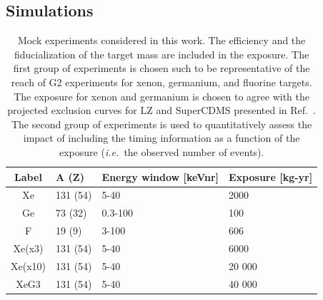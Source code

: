 \documentclass[11pt]{article}
\newcommand{\ie}{{\it i.e.~}}  \newcommand{\eg}{{\it e.g.~}}
\begin{document}
\subsection{Simulations\label{sec:sims}}
\begin{table}[tbp]
  \setlength{\extrarowheight}{3pt}
  \setlength{\tabcolsep}{10pt}
  \begin{center}
	\begin{tabular}{|c||m{2.3cm}|m{4.2cm}|m{2.8cm}|}  \hline
	Label & A (Z) & Energy window [keVnr] & Exposure [kg-yr] \\ \hline
	\hline
	Xe & 131 (54) & 5-40 & 2000 \\  \hline
	Ge & 73 (32) & 0.3-100 & 100  \\  \hline
	F &  19 (9) & 3-100 & 606 \\  \hline
	\hline
	Xe(x3) & 131 (54) & 5-40 & 6000 \\  \hline
	Xe(x10) & 131 (54) & 5-40 & 20 000 \\  \hline
	XeG3 & 131 (54) & 5-40 & 40 000 \\ \hline \hline
	\end{tabular}
  \end{center}
\caption{Mock experiments considered in this work. The efficiency and the fiducialization of the target mass are included in the exposure. The first group of experiments is chosen such to be representative of the reach of G2 experiments for xenon, germanium, and fluorine targets. The exposure for xenon and germanium is chosen to agree with the projected exclusion curves for LZ and SuperCDMS presented in Ref.~\cite{Cushman:2013zza}. The second group of experiments is used to quantitatively assess the impact of including the timing information as a function of the exposure (\ie the observed number of events).  }
\label{tab:experiments}
\end{table}
\end{document}
